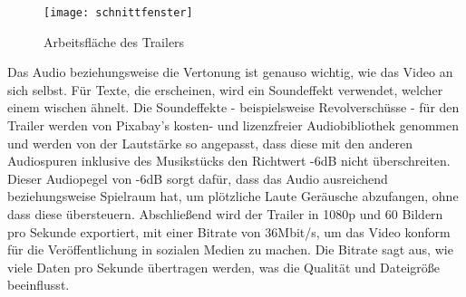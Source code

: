 \begin{figure}[H]
\centering
\texttt{[image: schnittfenster]}
\caption{Arbeitsfläche des Trailers}
\end{figure}

Das Audio beziehungsweise die Vertonung ist genauso wichtig, wie das Video an sich selbst.
Für Texte, die erscheinen, wird ein Soundeffekt verwendet, welcher einem wischen ähnelt.
Die Soundeffekte - beispielsweise Revolverschüsse - für den Trailer werden von Pixabay’s kosten- und lizenzfreier Audiobibliothek genommen und werden von der
Lautstärke so angepasst, dass diese mit den anderen Audiospuren inklusive des Musikstücks den Richtwert -6dB nicht überschreiten.
Dieser Audiopegel von -6dB sorgt dafür, dass das Audio ausreichend  beziehungsweise Spielraum
hat, um plötzliche Laute Geräusche abzufangen, ohne dass diese übersteuern. 
Abschließend wird der Trailer in 1080p und 60 Bildern pro Sekunde exportiert, mit einer Bitrate von 36Mbit/s, um das Video konform für die Veröffentlichung in sozialen Medien zu machen.
Die Bitrate sagt aus, wie viele Daten pro Sekunde übertragen werden, was die Qualität und Dateigröße beeinflusst. 



\renewcommand{\kapitelautor}{}
